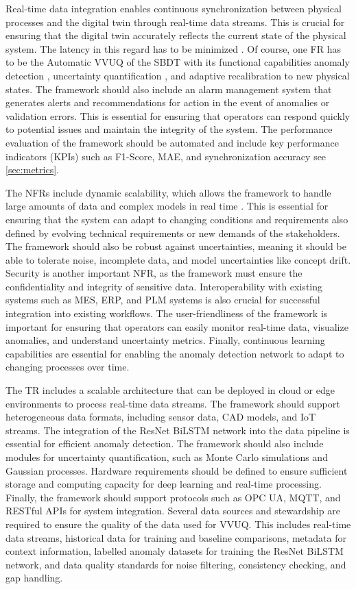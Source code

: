 Real-time data integration enables continuous synchronization between physical processes and the digital twin through real-time data streams. This is crucial for ensuring that the digital twin accurately reflects the current state of the physical system. The latency in this regard has to be minimized \autocite{li2018learning}. Of course, one FR has to be the Automatic VVUQ of the SBDT with its functional capabilities anomaly detection \autocite{pang2021deep}, uncertainty quantification \autocite{sel2025survey}, and adaptive recalibration to new physical states. The framework should also include an alarm management system that generates alerts and recommendations for action in the event of anomalies or validation errors. This is essential for ensuring that operators can respond quickly to potential issues and maintain the integrity of the system. The performance evaluation of the framework should be automated and include key performance indicators (KPIs) such as F1-Score, MAE, and synchronization accuracy see \autoref{sec:metrics}.

The NFRs include dynamic scalability, which allows the framework to handle large amounts of data and complex models in real time \autocite{leskovec2020mining}. This is essential for ensuring that the system can adapt to changing conditions and requirements also defined by evolving technical requirements or new demands of the stakeholders. The framework should also be robust against uncertainties, meaning it should be able to tolerate noise, incomplete data, and model uncertainties like concept drift. Security is another important NFR, as the framework must ensure the confidentiality and integrity of sensitive data. Interoperability with existing systems such as MES, ERP, and PLM systems is also crucial for successful integration into existing workflows. The user-friendliness of the framework is important for ensuring that operators can easily monitor real-time data, visualize anomalies, and understand uncertainty metrics. Finally, continuous learning capabilities are essential for enabling the anomaly detection network to adapt to changing processes over time.

The TR includes a scalable architecture that can be deployed in cloud or edge environments to process real-time data streams. The framework should support heterogeneous data formats, including sensor data, CAD models, and IoT streams. The integration of the ResNet BiLSTM network into the data pipeline is essential for efficient anomaly detection. The framework should also include modules for uncertainty quantification, such as Monte Carlo simulations and Gaussian processes. Hardware requirements should be defined to ensure sufficient storage and computing capacity for deep learning and real-time processing. Finally, the framework should support protocols such as OPC UA, MQTT, and RESTful APIs for system integration. Several data sources and stewardship are required to ensure the quality of the data used for VVUQ. This includes real-time data streams, historical data for training and baseline comparisons, metadata for context information, labelled anomaly datasets for training the ResNet BiLSTM network, and data quality standards for noise filtering, consistency checking, and gap handling.


